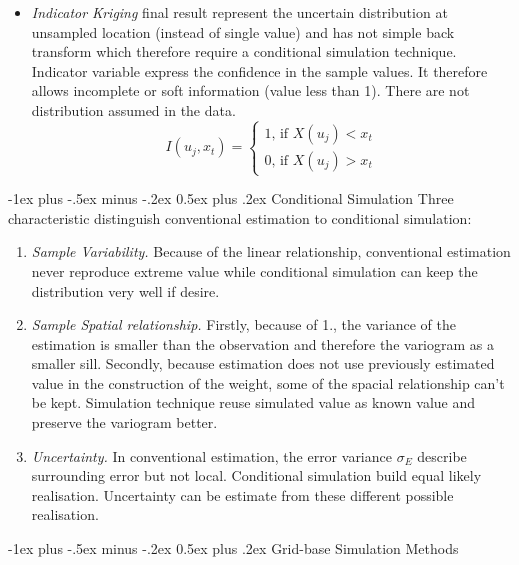 \documentclass[10pt,landscape]{article}
\makeatletter
\renewcommand{\section}{\@startsection{section}{1}{0mm}%
                                {-1ex plus -.5ex minus -.2ex}%
                                {0.5ex plus .2ex}%
                                {\normalfont\large\bfseries}}
\makeatother
\begin{document}
\begin{multicols}{3}
\begin{itemize}
	\item \emph{Indicator Kriging} final result represent the uncertain distribution at unsampled location (instead of single value) and has not simple back transform which therefore require a conditional simulation technique. Indicator variable express the confidence in the sample values. It therefore allows incomplete or soft information (value less than 1). There are not distribution assumed in the data.
\[I(u_j,x_t) = \left\{
	\begin{array}{l}
		1 \text{, if }X(u_j)<x_t\\
		0 \text{, if }X(u_j)>x_t
	\end{array}
\right.\]	

\end{itemize}




\section{Conditional Simulation}
Three characteristic distinguish conventional estimation to conditional simulation:
\begin{enumerate}
\item \emph{Sample Variability.} Because of the linear relationship, conventional estimation never reproduce extreme value while conditional simulation can keep the distribution very well if desire.
\item \emph{Sample Spatial relationship.} Firstly, because of 1., the variance of the estimation is smaller than the observation and therefore the variogram as a smaller sill. Secondly, because estimation does not use previously estimated value in the construction of the weight, some of the spacial relationship can't be kept. Simulation technique reuse simulated value as known value and preserve the variogram better.
\item \emph{Uncertainty.} In conventional estimation, the error variance $\sigma_E$ describe surrounding error but not local. Conditional simulation build equal likely realisation. Uncertainty can be estimate from these different possible realisation.
\end{enumerate}





\section{Grid-base Simulation Methods}


\end{multicols}
\end{document}
